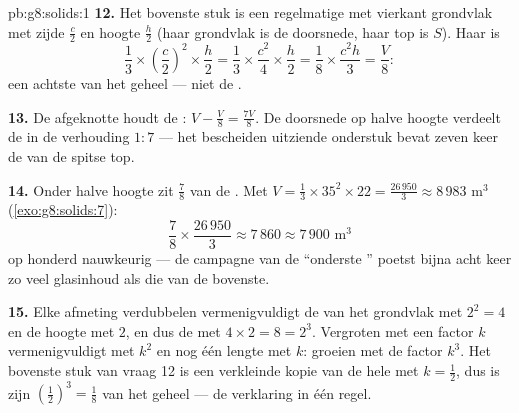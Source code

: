 \begin{solution}{pb:g8:solids:1}
\textbf{12.} Het bovenste stuk is een regelmatige  met vierkant grondvlak
met zijde $\frac c2$ en hoogte $\frac h2$ (haar grondvlak is de doorsnede, haar
top is $S$). Haar  is
\[
\frac13 \times \left(\frac c2\right)^2 \times \frac h2
= \frac13 \times \frac{c^2}{4} \times \frac h2
= \frac{1}{8} \times \frac{c^2 h}{3}
= \frac{V}{8} :
\]
een achtste van het geheel --- niet de .

\textbf{13.} De afgeknotte  houdt de : $V - \frac V8 = \frac{7V}{8}$.
De doorsnede op halve hoogte verdeelt de  in de verhouding $1 : 7$ --- het
bescheiden uitziende onderstuk bevat zeven keer de  van de spitse top.

\textbf{14.} Onder halve hoogte zit $\frac78$ van de . Met
$V = \frac13 \times 35^2 \times 22 = \frac{26\,950}{3} \approx 8\,983$ m$^3$
(\cref{exo:g8:solids:7}):
\[
\frac78 \times \frac{26\,950}{3} \approx 7\,860 \approx
7\,900 \text{ m}^3
\]
op honderd nauwkeurig --- de campagne van de ``onderste '' poetst bijna acht
keer zo veel glasinhoud als die van de bovenste.

\textbf{15.} Elke afmeting verdubbelen vermenigvuldigt de  van het
grondvlak met $2^2 = 4$ en de hoogte met $2$, en dus de  met
$4 \times 2 = 8 = 2^3$. Vergroten met een factor $k$ vermenigvuldigt
 met $k^2$ en nog één lengte met $k$:  groeien met de factor
$k^3$. Het bovenste stuk van vraag 12 is een verkleinde kopie van de hele
 met $k = \frac12$, dus is zijn 
$\left(\frac12\right)^3 = \frac18$ van het geheel --- de verklaring in één
regel.
\end{solution}
